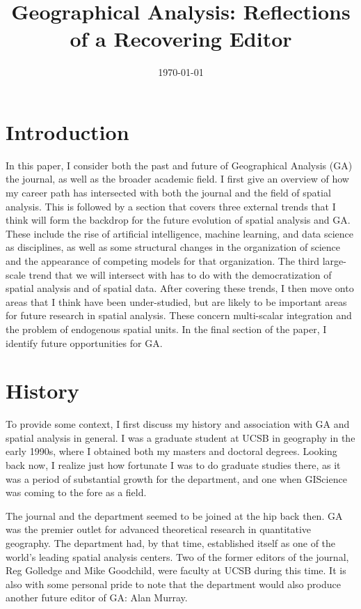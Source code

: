 \documentclass[11pt]{article}
\date{\today}
\title{Geographical Analysis: Reflections of a Recovering Editor}
\begin{document}
\maketitle

\section{Introduction}
\label{sec:org79c12a3}

In this paper, I consider both the past and future of Geographical Analysis (GA)
the journal, as well as the broader academic field. I first give an overview of
how my career path has intersected with both the journal and the field of
spatial analysis. This is followed by a section that covers three external
trends that I think will form the backdrop for the future evolution of spatial
analysis and GA. These include the rise of artificial intelligence, machine
learning, and data science as disciplines, as well as some structural changes in
the organization of science and the appearance of competing models for that
organization. The third large-scale trend that we will intersect with has to do
with the democratization of spatial analysis and of spatial data. After covering
these trends, I then move onto areas that I think have been under-studied, but
are likely to be important areas for future research in spatial analysis. These
concern multi-scalar integration and the problem of endogenous spatial units. In
the final section of the paper, I identify future opportunities for GA.

\section{History}
\label{sec:orgfb43d5b}
To provide some context, I first discuss my history and association with GA and spatial analysis in general. I was a graduate student at UCSB in
geography in the early 1990s, where I obtained both my masters and doctoral
degrees. Looking back now, I realize just how fortunate I was to do graduate studies
there, as it was a period of substantial growth for the department, and one when
GIScience was coming to the fore as a field.

The journal and the department seemed to be joined at the hip back then. GA was
the premier outlet for advanced theoretical research in quantitative geography.
The department had, by that time, established itself as one of the world's
leading spatial analysis centers. Two of the former editors of the journal, Reg
Golledge and Mike Goodchild, were faculty at UCSB during this time. It is also
with some personal pride to note that the department would also produce another
future editor of GA: Alan Murray.
\end{document}
